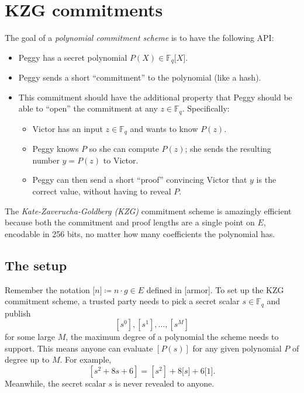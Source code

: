 \section{KZG commitments}\label{kzg}

The goal of a \emph{polynomial commitment scheme} is to have the
following API:

\begin{itemize}
\item
  Peggy has a secret polynomial
  \(P(X) \in {\mathbb{F}}_{q}\lbrack X\rbrack\).
\item
  Peggy sends a short ``commitment'' to the polynomial (like a hash).
\item
  This commitment should have the additional property that Peggy should
  be able to ``open'' the commitment at any \(z \in {\mathbb{F}}_{q}\).
  Specifically:

  \begin{itemize}
  \item
    Victor has an input \(z \in {\mathbb{F}}_{q}\) and wants to know
    \(P(z)\).
  \item
    Peggy knows \(P\) so she can compute \(P(z)\); she sends the
    resulting number \(y = P(z)\) to Victor.
  \item
    Peggy can then send a short ``proof'' convincing Victor that \(y\)
    is the correct value, without having to reveal \(P\).
  \end{itemize}
\end{itemize}

The \emph{Kate-Zaverucha-Goldberg (KZG)} commitment scheme is amazingly
efficient because both the commitment and proof lengths are a single
point on \(E\), encodable in 256 bits, no matter how many coefficients
the polynomial has.

\subsection{The setup}

Remember the notation \(\lbrack n\rbrack ≔ n \cdot g \in E\) defined in
{[}armor{]}. To set up the KZG commitment scheme, a trusted party needs
to pick a secret scalar \(s \in {\mathbb{F}}_{q}\) and publish
\[\left\lbrack s^{0} \right\rbrack,\left\lbrack s^{1} \right\rbrack,\ldots,\left\lbrack s^{M} \right\rbrack\]
for some large \(M\), the maximum degree of a polynomial the scheme
needs to support. This means anyone can evaluate
\(\left\lbrack P(s) \right\rbrack\) for any given polynomial \(P\) of
degree up to \(M\). For example,
\[\left\lbrack s^{2} + 8s + 6 \right\rbrack = \left\lbrack s^{2} \right\rbrack + 8\lbrack s\rbrack + 6\lbrack 1\rbrack.\]
Meanwhile, the secret scalar \(s\) is never revealed to anyone.

